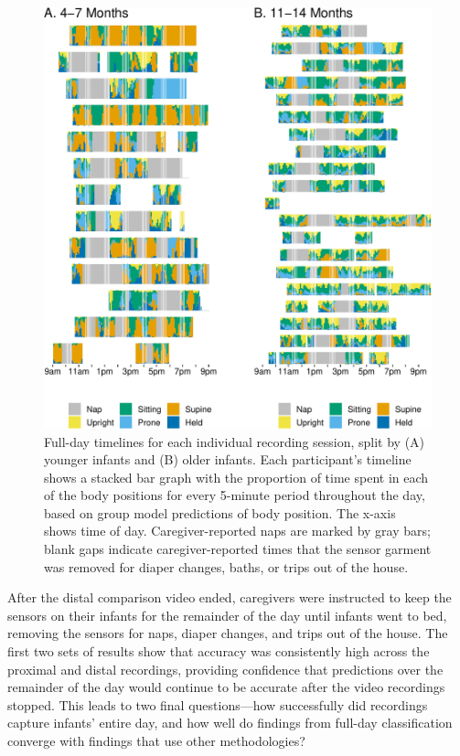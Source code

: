 \documentclass[
  man]{apa6}
\begin{document}
\begin{figure}

{\centering \includegraphics{manuscript_files/figure-latex/timelines-1} 

}

\caption{Full-day timelines for each individual recording session, split by (A) younger infants and (B) older infants. Each participant's timeline shows a stacked bar graph with the proportion of time spent in each of the body positions for every 5-minute period throughout the day, based on group model predictions of body position. The x-axis shows time of day. Caregiver-reported naps are marked by gray bars; blank gaps indicate caregiver-reported times that the sensor garment was removed for diaper changes, baths, or trips out of the house.}\label{fig:timelines}
\end{figure}

After the distal comparison video ended, caregivers were instructed to keep the sensors on their infants for the remainder of the day until infants went to bed, removing the sensors for naps, diaper changes, and trips out of the house. The first two sets of results show that accuracy was consistently high across the proximal and distal recordings, providing confidence that predictions over the remainder of the day would continue to be accurate after the video recordings stopped. This leads to two final questions---how successfully did recordings capture infants' entire day, and how well do findings from full-day classification converge with findings that use other methodologies?
\end{document}

